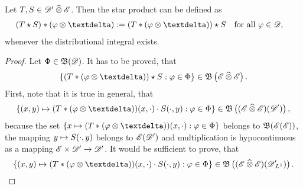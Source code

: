 \begin{theorem}
    Let $ T,S \in \mathscr{  D  }' \mathbin{\widehat{\otimes}} \mathscr{  E  } $.
    Then the star product can be defined as
    \begin{align}
        ( T \star S ) * ( \ph \tepro \sfdeo )
        :=
        ( T * ( \ph \tepro \sfdeo ) ) \star S
        &&&\text{for all $ \ph \in \fsTest $,}
    \end{align}
    whenever the distributional integral exists.
\end{theorem}
\begin{proof}
    Let $ \Phi \in \operatorname{\mathfrak{ B }}(\mathscr{  D  }) $.
    It has to be proved, that
    \begin{align}
        \BrmSet{ ( T * ( \ph \tepro \sfdeo ) ) \star S }{ \ph \in \Ph }
        \in
        \ssBnd\left( \fsSmo \ctepro \fsSmo \right)
        .
    \end{align}
    First, note that it is true in general, that
    \begin{align}
        \BrmSet{ (x,y) \mto ( T * ( \ph \tepro \sfdeo ) )(x,\cdot) \mult S(\cdot,y) }
        { \ph \in \Ph }
        \in
        \ssBnd\left( ( \fsSmo \ctepro \fsSmo )( \fsDis ) \right)
        ,
    \end{align}
    because the set $ \BrmSet{ x \mto ( T * ( \ph \tepro \sfdeo ) )(x,\cdot) }{ \ph \in \Ph } $
    belongs to $ \operatorname{\mathfrak{ B }}( \mathscr{  E  }( \mathscr{  E  } ) ) $,
    the mapping $ y \mapsto S(\cdot,y) $ belongs to $ \mathscr{  E  }( \mathscr{  D  }' ) $ and
    multiplication is hypocontinuous as a mapping $ \mathscr{  E  } \times \mathscr{  D  }' \to \mathscr{  D  }' $.
    It would be sufficient to prove, that
    \begin{align}
        \BrmSet{ (x,y) \mto ( T * ( \ph \tepro \sfdeo ) )(x,\cdot) \mult S(\cdot,y) }
        { \ph \in \Ph }
        \in
        \ssBnd\left( ( \fsSmo \ctepro \fsSmo )( \fsDisint ) \right)
        .
    \end{align}
\end{proof}


